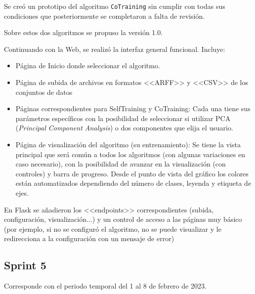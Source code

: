 Se creó un prototipo del algoritmo \texttt{CoTraining} sin cumplir con todas sus
condiciones que posteriormente se completaron a falta de revisión. 

Sobre estos dos algoritmos se propuso la versión 1.0. 

Continuando con la Web, se realizó la interfaz general funcional. Incluye:
\begin{itemize}
    \item Página de Inicio donde seleccionar el algoritmo.
    \item Página de subida de archivos en formatos <<ARFF>> y <<CSV>> de los
    conjuntos de datos
    \item Páginas correspondientes para SelfTraining y CoTraining: Cada una
    tiene sus parámetros específicos con la posibilidad de seleccionar si
    utilizar PCA (\textit{Principal Component Analysis}) o dos componentes que
    elija el usuario.
    \item Página de visualización del algoritmo (su entrenamiento): Se tiene la
    vista principal que será común a todos los algoritmos (con algunas
    variaciones en caso necesario), con la posibilidad de avanzar en la
    visualización (con controles) y barra de progreso. Desde el punto de vista
    del gráfico los colores están automatizados dependiendo del número de
    clases, leyenda y etiqueta de ejes.
\end{itemize}

En Flask se añadieron los <<endpoints>> correspondientes (subida, configuración,
visualización...) y un control de acceso a las páginas muy básico (por ejemplo,
si no se configuró el algoritmo, no se puede visualizar y le redirecciona a la
configuración con un mensaje de error)

\subsection{Sprint 5}
Corresponde con el periodo temporal del 1 al 8 de febrero de 2023.

